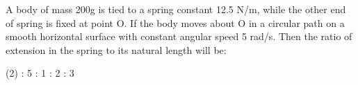 \item A body of mass 200g is tied to a spring constant 12.5 N/m, while the other end of spring is fixed at point O. If the body moves about O in a circular path on a smooth horizontal surface with constant angular speed 5 rad/s. Then the ratio of extension in the spring to its natural length will be:
    \begin{tasks}(2)
         : 5
         : 1
         : 2
         : 3
    \end{tasks}